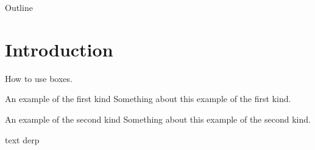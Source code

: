 


\begin{frame}
  \titlepage
\end{frame}

\begin{frame}{Outline}
  \tableofcontents
\end{frame}

\section{Introduction}

\begin{frame}{How to use boxes.}
\begin{block}{An example of the first kind}
  Something about this example of the first kind.
\end{block}
\begin{exampleblock}{An example of the second kind}
  Something about this example of the second kind.
\end{exampleblock}

\textcolor{ReneOrange}{text} derp

\end{frame}



 